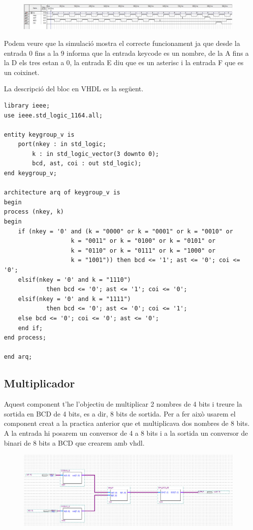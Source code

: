 \documentclass[12pt, a4papre]{article}
\begin{document}
	\begin{figure}[H]
		\begin{center}
		\includegraphics[width=130mm]{KCsim.jpeg}
		\end{center}
	\end{figure}
	
	Podem veure que la simulació mostra el correcte funcionament ja que desde la entrada 0 fins a la 9 informa que la entrada keycode es un nombre, de la A fins a la D els tres estan a 0, la entrada E diu que es un asterisc i la entrada F que es un coixinet.
	
	La descripció del bloc en VHDL es la següent.
	
		\begin{lstlisting}[style=vhdl, frame=single, basicstyle=\tiny]
library ieee;
use ieee.std_logic_1164.all;

entity keygroup_v is
	port(nkey : in std_logic;
		k : in std_logic_vector(3 downto 0);
		bcd, ast, coi : out std_logic);
end keygroup_v;

architecture arq of keygroup_v is
begin
process (nkey, k)
begin
	if (nkey = '0' and (k = "0000" or k = "0001" or k = "0010" or
				   k = "0011" or k = "0100" or k = "0101" or
				   k = "0110" or k = "0111" or k = "1000" or
				   k = "1001")) then bcd <= '1'; ast <= '0'; coi <= '0';
	elsif(nkey = '0' and k = "1110")
			then bcd <= '0'; ast <= '1'; coi <= '0';
	elsif(nkey = '0' and k = "1111")
			then bcd <= '0'; ast <= '0'; coi <= '1';
	else bcd <= '0'; coi <= '0'; ast <= '0';
	end if;
end process;

end arq;
\end{lstlisting}
	
	\subsection{Multiplicador}
	
	Aquest component t'he l'objectiu de multiplicar 2 nombres de 4 bits i treure la sortida en BCD de 4 bits, es a dir, 8 bits de sortida. Per a fer això usarem el component creat a la practica anterior que et multiplicava dos nombres de 8 bits. A la entrada hi posarem un conversor de 4 a 8 bits i a la sortida un conversor de binari de 8 bits a BCD que crearem amb vhdl.
	
	\begin{figure}[H]
		\begin{center}
		\includegraphics[width=130mm]{Mult_Bin_BCD.jpeg}
		\end{center}
	\end{figure}
	
\end{document}
